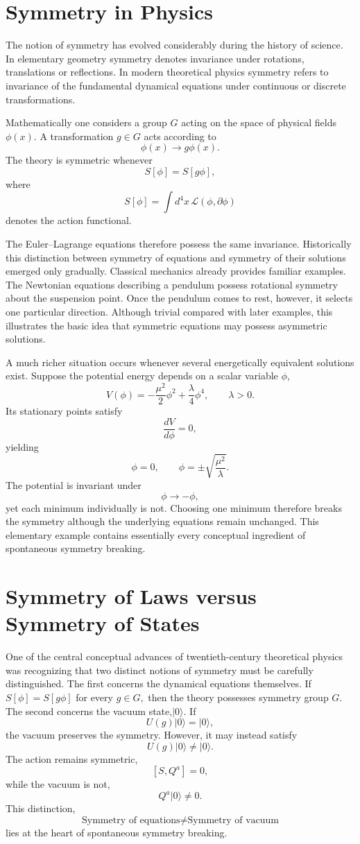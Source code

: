 \section{Symmetry in Physics}
The notion of symmetry has evolved considerably during the history of
science.
In elementary geometry symmetry denotes invariance under rotations,
translations or reflections.
In modern theoretical physics symmetry refers to invariance of the
fundamental dynamical equations under continuous or discrete
transformations.

Mathematically one considers a group $ G $
acting on the space of physical fields $\phi(x).$
A transformation $g\in G$ acts according to
\[\phi(x)\longrightarrow g\phi(x).\]
The theory is symmetric whenever
\[S[\phi]=S[g\phi],\]
where
\[S[\phi]=\int d^4x\,\mathcal L(\phi,\partial\phi)\]
denotes the action functional.

The Euler--Lagrange equations therefore possess the same invariance.
Historically this distinction between symmetry of equations and symmetry
of their solutions emerged only gradually.
Classical mechanics already provides familiar examples.
The Newtonian equations describing a pendulum possess rotational symmetry
about the suspension point. Once the pendulum comes to rest, however, it
selects one particular direction.
Although trivial compared with later examples, this illustrates the basic
idea that symmetric equations may possess asymmetric solutions.

A much richer situation occurs whenever several energetically equivalent
solutions exist.
Suppose the potential energy depends on a scalar variable $\phi$,
\[V(\phi)=-\frac{\mu^2}{2}\phi^2+
\frac{\lambda}{4}\phi^4,\qquad \lambda>0.\]
Its stationary points satisfy
\[\frac{dV}{d\phi}=0,\]
yielding
\[\phi=0,\qquad\phi=\pm\sqrt{\frac{\mu^2}{\lambda}}.\]
The potential is invariant under
\[\phi \rightarrow -\phi, \]
yet each minimum individually is not.
Choosing one minimum therefore breaks the symmetry although the
underlying equations remain unchanged.
This elementary example contains essentially every conceptual ingredient
of spontaneous symmetry breaking.

\section{Symmetry of Laws versus Symmetry of States}
One of the central conceptual advances of twentieth-century theoretical
physics was recognizing that two distinct notions of symmetry must be
carefully distinguished.
The first concerns the dynamical equations themselves.
If $S[\phi]=S[g\phi]$ for every $g\in G,$
then the theory possesses symmetry group $G$.
The second concerns the vacuum state,$|0\rangle.$ If
\[U(g)|0\rangle=|0\rangle,\]
the vacuum preserves the symmetry.
However, it may instead satisfy
\[U(g)|0\rangle \neq |0\rangle.\]
The action remains symmetric,
\[[S,Q^a]=0,\]
while the vacuum is not,
\[Q^a|0\rangle\neq0.\]
This distinction,
\[
\boxed{
\text{Symmetry of equations}
\neq
\text{Symmetry of vacuum}
}
\]
lies at the heart of spontaneous symmetry breaking.


